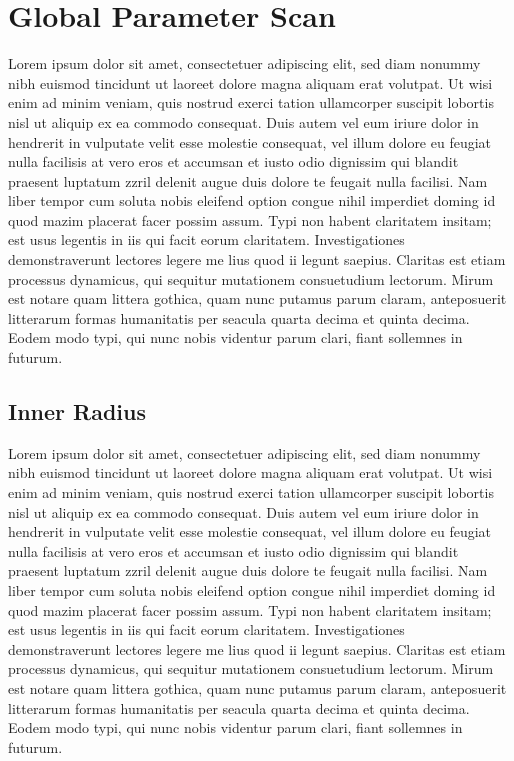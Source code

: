 \documentclass[final,3p,times,twocolumn]{elsarticle}
\begin{document}

\section{Global Parameter Scan}
Lorem ipsum dolor sit amet, consectetuer adipiscing elit, sed diam nonummy nibh euismod tincidunt ut laoreet dolore magna aliquam erat volutpat. Ut wisi enim ad minim veniam, quis
nostrud exerci tation ullamcorper suscipit lobortis nisl ut aliquip ex ea commodo consequat. Duis autem vel eum iriure dolor in hendrerit in vulputate velit esse molestie consequat,
vel illum dolore eu feugiat nulla facilisis at vero eros et accumsan et iusto odio dignissim qui blandit praesent luptatum zzril delenit augue duis dolore te feugait nulla facilisi.
Nam liber tempor cum soluta nobis eleifend option congue nihil imperdiet doming id quod mazim placerat facer possim assum. Typi non habent claritatem insitam; est usus legentis in
iis qui facit eorum claritatem. Investigationes demonstraverunt lectores legere me lius quod ii legunt saepius. Claritas est etiam processus dynamicus, qui sequitur mutationem
consuetudium lectorum. Mirum est notare quam littera gothica, quam nunc putamus parum claram, anteposuerit litterarum formas humanitatis per seacula quarta decima et quinta
decima. Eodem modo typi, qui nunc nobis videntur parum clari, fiant sollemnes in futurum.

\subsection{Inner Radius}
Lorem ipsum dolor sit amet, consectetuer adipiscing elit, sed diam nonummy nibh euismod tincidunt ut laoreet dolore magna aliquam erat volutpat. Ut wisi enim ad minim veniam, quis
nostrud exerci tation ullamcorper suscipit lobortis nisl ut aliquip ex ea commodo consequat. Duis autem vel eum iriure dolor in hendrerit in vulputate velit esse molestie consequat,
vel illum dolore eu feugiat nulla facilisis at vero eros et accumsan et iusto odio dignissim qui blandit praesent luptatum zzril delenit augue duis dolore te feugait nulla facilisi.
Nam liber tempor cum soluta nobis eleifend option congue nihil imperdiet doming id quod mazim placerat facer possim assum. Typi non habent claritatem insitam; est usus legentis in
iis qui facit eorum claritatem. Investigationes demonstraverunt lectores legere me lius quod ii legunt saepius. Claritas est etiam processus dynamicus, qui sequitur mutationem
consuetudium lectorum. Mirum est notare quam littera gothica, quam nunc putamus parum claram, anteposuerit litterarum formas humanitatis per seacula quarta decima et quinta
decima. Eodem modo typi, qui nunc nobis videntur parum clari, fiant sollemnes in futurum.
\end{document}
